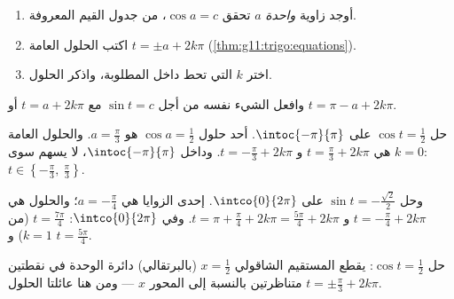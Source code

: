 \begin{method}[حل $\cos t = c$ على فترة]\label{met:g11:trigo:solve}
\begin{enumerate}
  \item أوجد زاوية \emph{واحدة} $a$ تحقق $\cos a = c$، من جدول
        القيم المعروفة.
  \item اكتب الحلول العامة $t = \pm a + 2k\pi$
        (\cref{thm:g11:trigo:equations}).
  \item اختر  $k$ التي تحط داخل  المطلوبة،
        واذكر الحلول.
\end{enumerate}
وافعل الشيء نفسه من أجل $\sin t = c$ مع $t = a + 2k\pi$ أو
$t = \pi - a + 2k\pi$.
\end{method}

\begin{example}\label{ex:g11:trigo:solve}
حل $\cos t = \frac12$ على $\intoc{-\pi}{\pi}$. أحد حلول
$\cos a = \frac12$ هو $a = \frac{\pi}{3}$. والحلول العامة هي
$t = \frac\pi3 + 2k\pi$ و $t = -\frac\pi3 + 2k\pi$. وداخل
$\intoc{-\pi}{\pi}$، لا يسهم سوى $k = 0$:
$t \in \left\{-\frac\pi3,\ \frac\pi3\right\}$.

وحل $\sin t = -\frac{\sqrt2}{2}$ على $\intco{0}{2\pi}$. إحدى الزوايا هي
$a = -\frac\pi4$؛ والحلول هي $t = -\frac\pi4 + 2k\pi$ و
$t = \pi + \frac\pi4 + 2k\pi = \frac{5\pi}{4} + 2k\pi$. وفي
$\intco{0}{2\pi}$: $t = \frac{7\pi}{4}$ (من $k = 1$) و
$t = \frac{5\pi}{4}$.
\end{example}

\begin{omfigure}

{\small حل $\cos t = \frac12$: يقطع المستقيم الشاقولي $x = \frac12$
(بالبرتقالي) دائرة الوحدة في نقطتين متناظرتين بالنسبة إلى المحور $x$
--- ومن هنا عائلتا الحلول $t = \pm\frac\pi3 + 2k\pi$.}
\end{omfigure}

